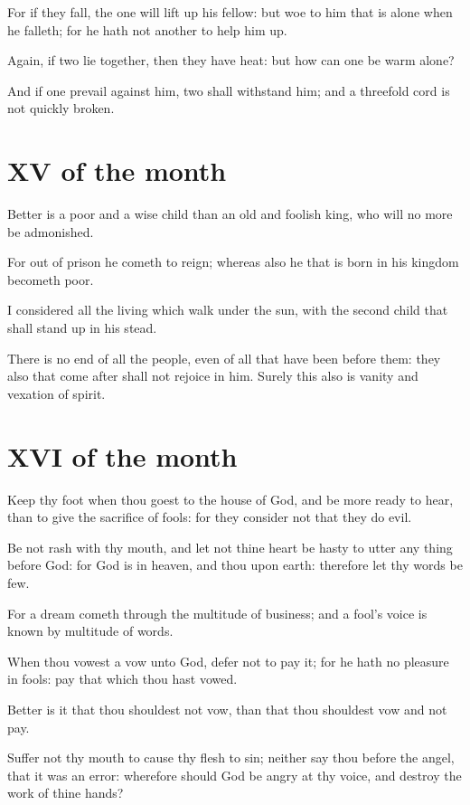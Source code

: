For if they fall, the one will lift up his fellow: but woe to him that is alone when he falleth; for he hath not another to help him up.

Again, if two lie together, then they have heat: but how can one be warm alone?

And if one prevail against him, two shall withstand him; and a threefold cord is not quickly broken.

\section{XV of the month}

Better is a poor and a wise child than an old and foolish king, who will no more be admonished.

For out of prison he cometh to reign; whereas also he that is born in his kingdom becometh poor.

I considered all the living which walk under the sun, with the second child that shall stand up in his stead.

There is no end of all the people, even of all that have been before them: they also that come after shall not rejoice in him. Surely this also is vanity and vexation of spirit.

\section{XVI of the month}

Keep thy foot when thou goest to the house of God, and be more ready to hear, than to give the sacrifice of fools: for they consider not that they do evil.

Be not rash with thy mouth, and let not thine heart be hasty to utter any thing before God: for God is in heaven, and thou upon earth: therefore let thy words be few.

For a dream cometh through the multitude of business; and a fool's voice is known by multitude of words.

When thou vowest a vow unto God, defer not to pay it; for he hath no pleasure in fools: pay that which thou hast vowed.

Better is it that thou shouldest not vow, than that thou shouldest vow and not pay.

Suffer not thy mouth to cause thy flesh to sin; neither say thou before the angel, that it was an error: wherefore should God be angry at thy voice, and destroy the work of thine hands?


